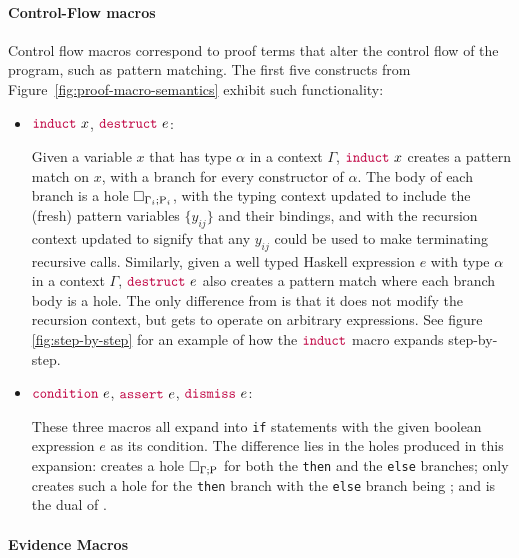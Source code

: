 \paragraph*{Control-Flow macros}

Control flow macros correspond to proof terms that alter the control
flow of the program, such as pattern matching. The first five
constructs from Figure~\ref{fig:proof-macro-semantics} exhibit such
functionality:

\begin{itemize}
\item ${\color{purple}\mathtt{induct}} ~ x$, ${\color{purple}\mathtt{destruct}} ~ e$:

  Given a variable $x$ that has type $\alpha$ in a context $\Gamma$,
  ${\color{purple}\mathtt{induct}} ~ x$ creates a pattern match on $x$, with a branch
  for every constructor of $\alpha$. The body of each branch is a hole
  $\Box_{\Gamma_i ; \mathrm{P}_i}$, with the typing context updated to
  include the (fresh) pattern variables $\{y_{ij}\}$ and their
  bindings, and with the recursion context updated to signify that any
  $y_{ij}$ could be used to make terminating recursive
  calls. Similarly, given a well typed Haskell expression $e$ with
  type $\alpha$ in a context $\Gamma$, ${\color{purple}\mathtt{destruct}} ~ e$ also
  creates a pattern match where each branch body is a hole. The only
  difference from  is that it does not modify the
  recursion context, but gets to operate on arbitrary expressions. See figure
  \ref{fig:step-by-step} for an example of how the ${\color{purple}\mathtt{induct}}$ macro
  expands step-by-step.

\item ${\color{purple}\mathtt{condition}} ~ e$, ${\color{purple}\mathtt{assert}} ~ e$, ${\color{purple}\mathtt{dismiss}} ~ e$:

  These three macros all expand into \texttt{if} statements with the
  given boolean expression $e$ as its condition. The difference lies
  in the holes produced in this expansion:  creates a
  hole $\Box_{\Gamma ; \mathrm{P}}$ for both the \texttt{then} and the
  \texttt{else} branches;  only creates such a hole for
  the \texttt{then} branch with the \texttt{else} branch being
  ; and  is the dual of .
\end{itemize}

\paragraph{Evidence Macros}

